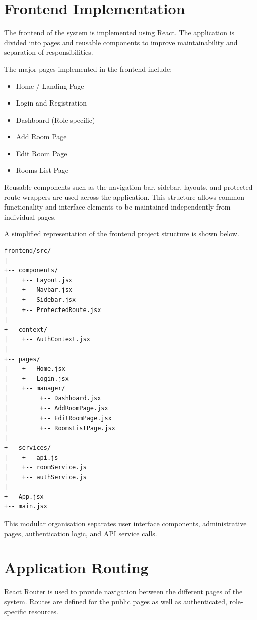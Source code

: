 \section{Frontend Implementation}

The frontend of the system is implemented using React. The application is divided into pages and reusable components to improve maintainability and separation of responsibilities.

The major pages implemented in the frontend include:

\begin{itemize}
    \item Home / Landing Page
    \item Login and Registration
    \item Dashboard (Role-specific)
    \item Add Room Page
    \item Edit Room Page
    \item Rooms List Page
\end{itemize}

Reusable components such as the navigation bar, sidebar, layouts, and protected route wrappers are used across the application. This structure allows common functionality and interface elements to be maintained independently from individual pages.

A simplified representation of the frontend project structure is shown below.

\begin{verbatim}
frontend/src/
|
+-- components/
|    +-- Layout.jsx
|    +-- Navbar.jsx
|    +-- Sidebar.jsx
|    +-- ProtectedRoute.jsx
|
+-- context/
|    +-- AuthContext.jsx
|
+-- pages/
|    +-- Home.jsx
|    +-- Login.jsx
|    +-- manager/
|         +-- Dashboard.jsx
|         +-- AddRoomPage.jsx
|         +-- EditRoomPage.jsx
|         +-- RoomsListPage.jsx
|
+-- services/
|    +-- api.js
|    +-- roomService.js
|    +-- authService.js
|
+-- App.jsx
+-- main.jsx
\end{verbatim}

This modular organisation separates user interface components, administrative pages, authentication logic, and API service calls.

\section{Application Routing}

React Router is used to provide navigation between the different pages of the system. Routes are defined for the public pages as well as authenticated, role-specific resources.

